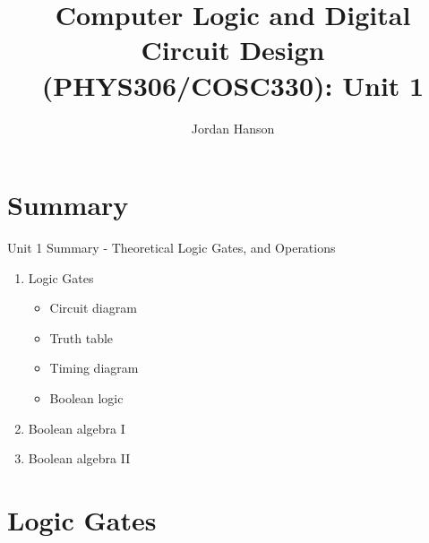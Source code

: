 \documentclass{beamer}
\title{Computer Logic and Digital Circuit Design (PHYS306/COSC330): Unit 1}
\author{Jordan Hanson}
\institute{Whittier College Department of Physics and Astronomy}
\begin{document}
\maketitle

\section{Summary}

\begin{frame}{Unit 1 Summary - Theoretical Logic Gates, and Operations}
\begin{enumerate}
\item Logic Gates
\begin{itemize}
\item Circuit diagram
\item Truth table
\item Timing diagram
\item Boolean logic
\end{itemize}
\item \alert{Boolean algebra I}
\item \alert{Boolean algebra II}
\end{enumerate}
\end{frame}

\section{Logic Gates}
\end{document}
